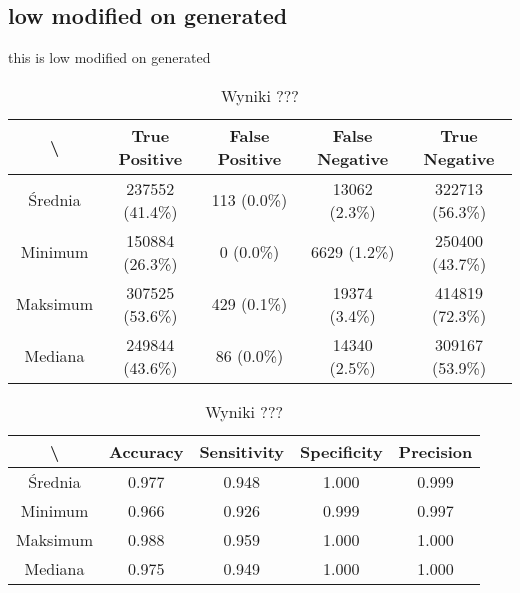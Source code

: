 \subsection{low modified on generated}
this is low modified on generated

\begin{table}[H]
	\centering
	\caption{Wyniki ???}
	\vspace{6pt}
	{\footnotesize
		\begin{tabular}{|c|c|c|c|c|}
      \hline \textbackslash & True Positive & False Positive & False Negative & True Negative \\
      \hline Średnia & 237552 (41.4\%) & 113 (0.0\%) & 13062 (2.3\%) & 322713 (56.3\%) \\
      \hline Minimum & 150884 (26.3\%) & 0 (0.0\%) & 6629 (1.2\%) & 250400 (43.7\%) \\
      \hline Maksimum & 307525 (53.6\%) & 429 (0.1\%) & 19374 (3.4\%) & 414819 (72.3\%) \\
      \hline Mediana & 249844 (43.6\%) & 86 (0.0\%) & 14340 (2.5\%) & 309167 (53.9\%) \\
      \hline
		\end{tabular}
	}
	\vspace{0pt}
\end{table}


\begin{table}[H]
	\centering
	\caption{Wyniki ???}
	\vspace{6pt}
	{\footnotesize
		\begin{tabular}{|c|c|c|c|c|}
      \hline \textbackslash & Accuracy & Sensitivity & Specificity & Precision \\
      \hline Średnia & 0.977 & 0.948 & 1.000 & 0.999 \\
      \hline Minimum & 0.966 & 0.926 & 0.999 & 0.997 \\
      \hline Maksimum & 0.988 & 0.959 & 1.000 & 1.000 \\
      \hline Mediana & 0.975 & 0.949 & 1.000 & 1.000 \\
      \hline
		\end{tabular}
	}
	\vspace{0pt}
\end{table}


